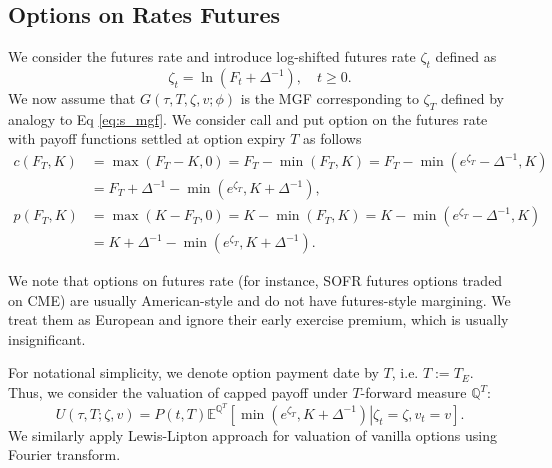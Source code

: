 \documentclass[pdftex,11pt,a4paper] {article}
\begin{document}
\subsection{Options on Rates Futures}

We consider the futures rate and introduce log-shifted futures rate $\zeta_t$ defined as
\begin{equation}\label{eq:log_shifted_futures}
\zeta_t=\ln\left(F_t+\Delta^{-1}\right), \quad t\ge 0.
\end{equation}
We now assume that $G(\tau,T,\zeta,v;\phi)$ is the MGF corresponding to $\zeta_T$ defined by analogy to Eq \eqref{eq:s_mgf}. We consider call and put option on the futures rate with payoff functions settled at option expiry $T$ as follows
\begin{equation}\label{eq:payoff_futures}
\begin{split}
c(F_T,K)&=\max(F_T-K,0)=F_T-\min(F_T,K)=F_T-\min(e^{\zeta_T}-\Delta^{-1},K)\\
&=F_T+\Delta^{-1}-\min(e^{\zeta_T},K+\Delta^{-1}),\\
p(F_T,K)&=\max(K-F_T,0)=K-\min(F_T,K)=K-\min(e^{\zeta_T}-\Delta^{-1},K)\\
&=K+\Delta^{-1}-\min(e^{\zeta_T},K+\Delta^{-1}).
\end{split}
\end{equation}


We note that options on futures rate (for instance, SOFR futures options traded on CME) are usually American-style and do not have futures-style margining. 
We treat them as European and ignore their early exercise premium, which is usually insignificant.  

For notational simplicity, we denote option payment date by $T$, i.e. $T:=T_E$. Thus, we consider the valuation of capped payoff under $T$-forward measure $\mathbb{Q}^{T}$:
\begin{equation}
U(\tau, T; \zeta,v)=P(t,T)\mathbb{E}^{\mathbb{Q}^{T}}\left[\left.\min(e^{\zeta_{T}},K+\Delta^{-1})\right|\zeta_t=\zeta,v_t=v\right].
\end{equation}
We similarly apply Lewis-Lipton approach for valuation of vanilla options using Fourier transform.
\end{document}
